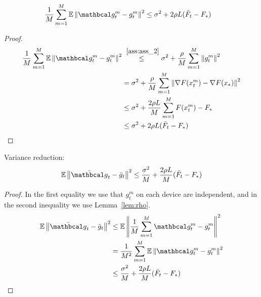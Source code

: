 \begin{lemma} \label{lem:rho}
    \begin{align}
        \frac{1}{M} \summ{m=1}{M} \E \norm{\mc{g}^m_t - g^m_t}^2
        &\leq
        \sigma^2 + 2 \rho L (\bar{F}_t - F_*)
    \end{align}
\end{lemma}
\begin{proof}
    \begin{align}
        \frac{1}{M} \summ{m=1}{M} \E \norm{\mc{g}^m_t - g^m_t}^2
        &\overset{~\ref{ass:ass_2}}{\leq}
        \sigma^2 + \frac{\rho}{M} \summ{m=1}{M} \norm {g^m_t}^2 \\
        &=
        \sigma^2 + \frac{\rho}{M} \summ{m=1}{M} \norm {\nabla F(x^m_t) - \nabla F(x_*)}^2 \\
        &\leq
        \sigma^2 + \frac{2 \rho L}{M} \summ{m=1}{M} {F(x^m_t) - F_*} \\
        &\leq 
        \sigma^2 + 2 \rho L (\bar{F}_t - F_*)
    \end{align}
\end{proof}


\begin{lemma} \label{lem:var_red}
    Variance reduction:
    \begin{align}
        \E \norm{\bar{\mc{g}}_t - \bar{g}_t}^2 
        \leq 
        \frac{\sigma^2}{M} + \frac{2 \rho L }{M}(\bar{F}_t - F_*)
    \end{align}
\end{lemma}
\begin{proof} In the first equality we use that $g^m_t$ on each device are independent, and in the second inequality we use Lemma~\ref{lem:rho}.
    \begin{align}
        \E \norm{\bar{\mc{g}}_t - \bar{g}_t}^2 
        &\leq 
        \E \norm{\fsumm{m=1}{M}{\mc{g}^m_t - g^m_t}}^2 \\
        &=
        \frac{1}{M^2} \summ{m=1}{M} \E \norm{\mc{g}^m_t - g^m_t}^2 \\
        &\leq
        \frac{\sigma^2}{M} + \frac{2 \rho L }{M}(\bar{F}_t - F_*)
    \end{align}
\end{proof}



